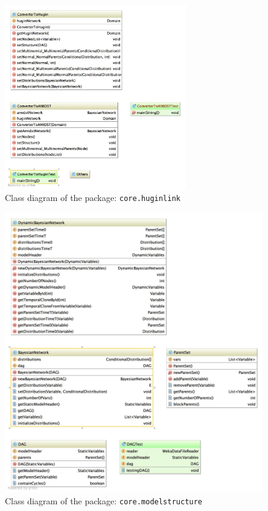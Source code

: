 \begin{figure}[h!]
  \caption{Class diagram of the package: \texttt{core.huginlink}}
  \centering
    \includegraphics[width=0.7\textwidth]{ClassDiagrams/core_huginlink.jpg}
\end{figure}


\begin{figure}[h!]
  \caption{Class diagram of the package: \texttt{core.modelstructure}}
  \centering
    \includegraphics[width=\textwidth]{ClassDiagrams/core_modelstructure.jpg}
\end{figure}

